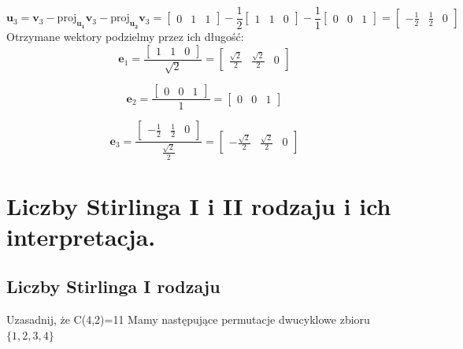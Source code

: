 \documentclass[12pt]{article}
\begin{document}
    $$
    \mathbf{u}_3 =  \mathbf{v}_3 - \mathrm{proj}_\mathbf{u_1} \mathbf{v}_3 - \mathrm{proj}_\mathbf{u_2} \mathbf{v}_3= 
    \begin{bmatrix}
    0 & 1 & 1
    \end{bmatrix}
    -
    \frac{1}{2}
    \begin{bmatrix}
    1 & 1 & 0
    \end{bmatrix}
    -
    \frac{1}{1}
    \begin{bmatrix}
    0 & 0 & 1
    \end{bmatrix}
    =
    \begin{bmatrix}
    -\frac{1}{2} & \frac{1}{2} & 0
    \end{bmatrix}
    $$
    Otrzymane wektory podzielmy przez ich długość:
    $$
    \mathbf{e}_1 =
    \frac
    {\begin{bmatrix}
    1 & 1 & 0
    \end{bmatrix}}
    {\sqrt{2}}
    =
    \begin{bmatrix}
    \frac{\sqrt{2}}{2} & \frac{\sqrt{2}}{2} & 0
    \end{bmatrix}
    $$
    
    $$
    \mathbf{e}_2 =
    \frac
    {\begin{bmatrix}
    0 & 0 & 1
    \end{bmatrix}}
    {1}
    =
    \begin{bmatrix}
    0 & 0 & 1
    \end{bmatrix}
    $$
    
    $$
    \mathbf{e}_3 =
    \frac
    {\begin{bmatrix}
    -\frac{1}{2} & \frac{1}{2} & 0
    \end{bmatrix}}
    {\frac{\sqrt{2}}{2}}
    =
    \begin{bmatrix}
    -\frac{\sqrt{2}}{2} & \frac{\sqrt{2}}{2} & 0
    \end{bmatrix}
    $$

\newpage

    \section{Liczby Stirlinga I i II rodzaju i ich interpretacja.}
    \subsection{Liczby Stirlinga I rodzaju}
    Uzasadnij, że C(4,2)=11\newline 
    Mamy następujące permutacje dwucyklowe zbioru $\{1, 2, 3, 4\}$ \newline
\end{document}

